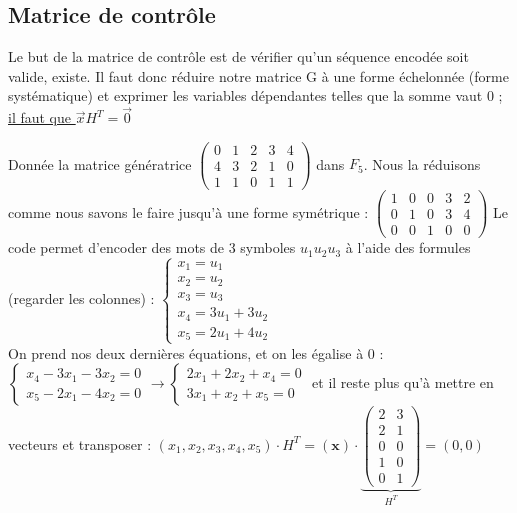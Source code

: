 \documentclass[11pt,a4paper]{article}
\begin{document}
\subsection{Matrice de contrôle}
\label{controle}
Le but de la matrice de contrôle est de vérifier qu'un séquence encodée soit valide, existe. Il faut donc réduire notre matrice G à une forme échelonnée (forme systématique) et exprimer les variables dépendantes telles que la somme vaut 0 ; \uline{il faut que $\vec{x}H^T = \vec{0}$}
\begin{exemple}
	Donnée la matrice génératrice 
	$\begin{pmatrix}
		0&1&2&3&4\\
		4&3&2&1&0\\
		1&1&0&1&1
	\end{pmatrix}$ dans $F_5$. Nous la réduisons comme nous savons le faire jusqu'à une forme symétrique : $\begin{pmatrix}
	1&0&0&3&2\\
	0&1&0&3&4\\
	0&0&1&0&0
	\end{pmatrix}$ Le code permet d'encoder des mots de 3 symboles $u_1u_2u_3$ à l'aide des formules (regarder les colonnes) :
	$\left\{\begin{array}{l}
	x_1 = u_1\\
	x_2 = u_2\\
	x_3 = u_3\\
	x_4 = 3u_1 + 3u_2\\
	x_5 = 2u_1 + 4u_2
	\end{array}\right.$\\
	 On prend nos deux dernières équations, et on les égalise à 0 :
	$\left\{\begin{array}{l}
	x_4-3x_1-3x_2 = 0\\
	x_5-2x_1-4x_2 = 0
	\end{array}\right. \to
	\left\{\begin{array}{l}
	2x_1+2x_2+x_4 = 0\\
	3x_1+x_2+x_5 = 0
	\end{array}\right.$ et il reste plus qu'à mettre en vecteurs et transposer :
	$(x_1,x_2,x_3,x_4,x_5)\cdot H^T = (\textbf{x}) \cdot \underbrace{\begin{pmatrix}
	2&3\\
	2&1\\
	0&0\\
	1&0\\
	0&1
	\end{pmatrix}}_{H^T} = (0,0)$
\end{exemple}
\end{document}
